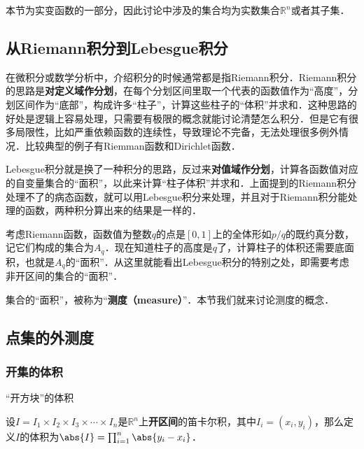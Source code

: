 


本节为实变函数的一部分，因此讨论中涉及的集合均为实数集合$\mathbb{R}^n$或者其子集．


\subsection{从Riemann积分到Lebesgue积分}


在微积分或数学分析中，介绍积分的时候通常都是指Riemann积分．Riemann积分的思路是\textbf{对定义域作分划}，在每个分划区间里取一个代表的函数值作为“高度”，分划区间作为“底部”，构成许多“柱子”，计算这些柱子的“体积”并求和．这种思路的好处是逻辑上容易处理，只需要有极限的概念就能讨论清楚怎么积分．但是它有很多局限性，比如严重依赖函数的连续性，导致理论不完备，无法处理很多例外情况．比较典型的例子有Riemman函数和Dirichlet函数．

Lebesgue积分就是换了一种积分的思路，反过来\textbf{对值域作分划}，计算各函数值对应的自变量集合的“面积”，以此来计算“柱子体积”并求和．上面提到的Riemann积分处理不了的病态函数，就可以用Lebesgue积分来处理，并且对于Riemann积分能处理的函数，两种积分算出来的结果是一样的．

考虑Riemann函数，函数值为整数$q$的点是$[0, 1]$上的全体形如$p/q$的既约真分数，记它们构成的集合为$A_q$．现在知道柱子的高度是$q$了，计算柱子的体积还需要底面积，也就是$A_q$的“面积”．从这里就能看出Lebesgue积分的特别之处，即需要考虑非开区间的集合的“面积”．

集合的“面积”，被称为“\textbf{测度（measure）}”．本节我们就来讨论测度的概念．



\subsection{点集的外测度}

\subsubsection{开集的体积}

\begin{definition}{“开方块”的体积}\label{SetMet_def1}

设$I=I_1\times I_2\times I_3\times\cdots\times I_n$是$\mathbb{R}^n$上\textbf{开区间}的笛卡尔积，其中$I_i=(x_i, y_i)$，那么定义$I$的体积为$\abs{I} = \prod_{i=1}^n \abs{y_i-x_i}$．

\end{definition}


